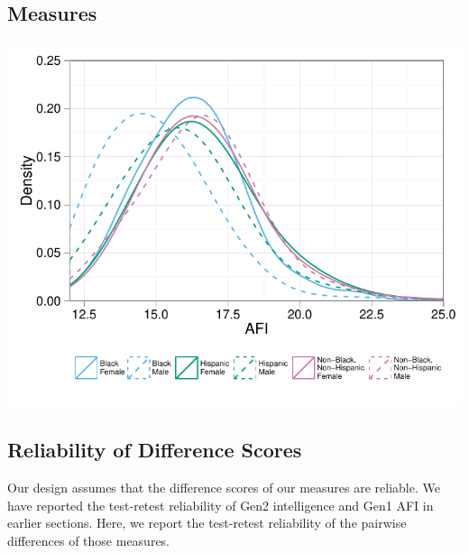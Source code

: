 \documentclass[a4paper,man,apacite,natbib,12pt,longtable,mask]{apa6}\usepackage[]{graphicx}\usepackage[]{color}
\newenvironment{knitrout}{}{} %
\begin{document}
\subsection{Measures}

\noindent\begin{minipage}{\linewidth}
\label{plot_afi_by_race_sex}
\begin{center}
\begin{knitrout}
\color{fgcolor}
\includegraphics[width=.65\paperwidth]{figure/plot_afi_by_race_sex-1} 

\end{knitrout}
\end{center}
\end{minipage}
%

%
\subsection{Reliability of Difference Scores}

Our design assumes that the difference scores of our measures are reliable. We have reported the test-retest reliability of Gen2 intelligence and Gen1 AFI in earlier sections. Here, we report the test-retest reliability of the pairwise differences of those measures. 
\end{document}
